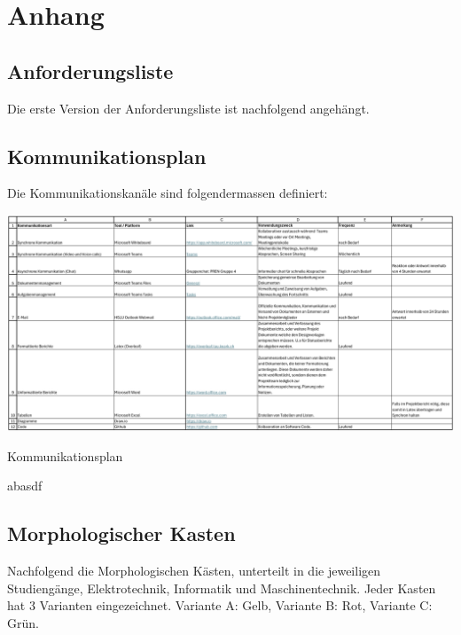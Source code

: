 \newpage
\section{Anhang}

\subsection{Anforderungsliste}\label{anforderungliste}

Die erste Version der Anforderungsliste ist nachfolgend angehängt.





\begin{landscape}
\subsection{Kommunikationsplan}\label{kommunikationsplan}
Die Kommunikationskanäle sind folgendermassen definiert:

\begin{table}[h]
\centering
\includegraphics[width=230mm]{assets/Kommunikationschnittstellen.pdf}
\caption{Kommunikationsplan}
\label{table:communications-plan}
\end{table}
\end{landscape}

\newpage

abasdf

\newpage


\subsection{Morphologischer Kasten}\label{Morphologischer Kasten}
Nachfolgend die Morphologischen Kästen, unterteilt in die jeweiligen Studiengänge, Elektrotechnik, Informatik und Maschinentechnik. Jeder Kasten hat 3 Varianten eingezeichnet. Variante A: Gelb, Variante B: Rot, Variante C: Grün.

